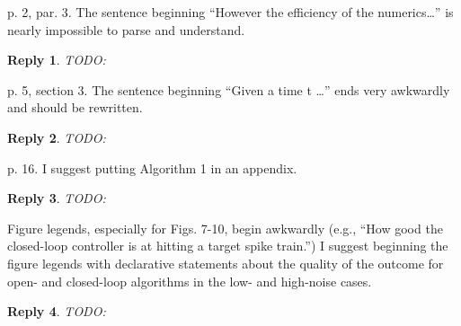 \documentclass{article}
\newtheorem*{rep}{Reply}
\begin{document}
p. 2, par. 3.  The sentence beginning ``However the efficiency of the
numerics\ldots'' is nearly impossible to parse and understand.


\begin{rep} TODO: \end{rep}

p. 5, section 3.  The sentence beginning “Given a time t …” ends very awkwardly and should be rewritten.

\begin{rep} TODO: \end{rep}

p. 16.  I suggest putting Algorithm 1 in an appendix. 

\begin{rep} TODO: \end{rep}

Figure legends, especially for Figs. 7-10, begin awkwardly (e.g., “How good the
closed-loop controller is at hitting a target spike train.”)  I suggest
beginning the figure legends with declarative statements about the quality of
the outcome for open- and closed-loop algorithms in the low- and high-noise
cases.


\begin{rep} TODO: \end{rep}



 

% 
% 
\end{document}
